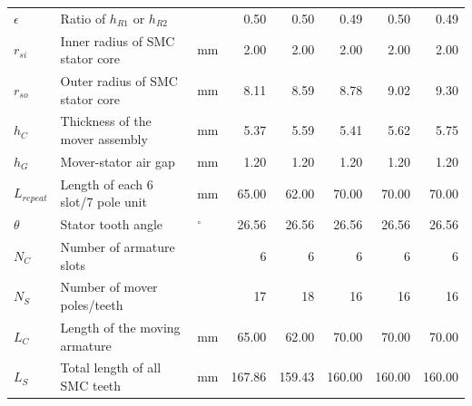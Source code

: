 \begin{landscape}
\begin{table}
\begin{tabular}{lllrrrrr}
                        $\epsilon$           & Ratio of $h_{R1}$ or $h_{R2}$             &                & 0.50           & 0.50           & 0.49           & 0.50           & 0.49           \\
                        $r_{si}$             & Inner radius of SMC stator core           & $\mathrm{mm}$  & 2.00           & 2.00           & 2.00           & 2.00           & 2.00           \\
                        $r_{so}$             & Outer radius of SMC stator core           & $\mathrm{mm}$  & 8.11           & 8.59           & 8.78           & 9.02           & 9.30           \\
                        $h_C$                & Thickness of the mover assembly           & $\mathrm{mm}$  & 5.37           & 5.59           & 5.41           & 5.62           & 5.75           \\
                        $h_G$                & Mover-stator air gap                      & $\mathrm{mm}$  & 1.20           & 1.20           & 1.20           & 1.20           & 1.20           \\
                        $L_{repeat}$         & Length of each 6 slot/7 pole unit         & $\mathrm{mm}$  & 65.00          & 62.00          & 70.00          & 70.00          & 70.00          \\
                        $\theta$             & Stator tooth angle                        & $\mathrm{^\circ}$   & 26.56           & 26.56         & 26.56          & 26.56          & 26.56  \\
                        \hline
                        $N_C$                & Number of armature slots                  &                & 6              & 6              & 6              & 6              & 6              \\
                        $N_S$                & Number of mover poles/teeth                      &                & 17             & 18             & 16             & 16             & 16             \\
                        $L_C$                & Length of the moving armature             & $\mathrm{mm}$  & 65.00          & 62.00          & 70.00          & 70.00          & 70.00          \\
                        $L_S$                & Total length of all SMC teeth             & $\mathrm{mm}$  & 167.86         & 159.43         & 160.00         & 160.00         & 160.00         \\

\end{tabular}
\end{table}
\end{landscape}
